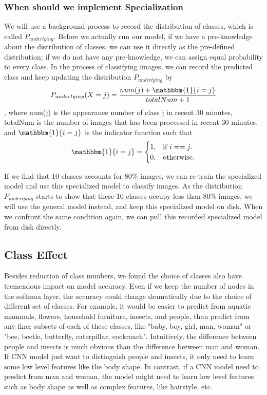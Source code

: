 \documentclass{article}
\begin{document}
\subsubsection{When should we implement Specialization}
We will use a background process to record the distribution of classes, which is called $P_{underlying}$. Before we actually run our model, if we have a pre-knowledge about the distribution of classes, we can use it directly as the pre-defined distribution; if we do not have any pre-knowledge, we can assign equal probability to every class. In the process of classifying images, we can record the predicted class and keep updating the distribution $P_{underlying}$ by
\begin{equation}
    P_{underlying}(X = j) = \frac{num(j)+  \mathbbm{1}\{i = j\} }{totalNum + 1}
\end{equation}
, where num(j) is the appearance number of class j in recent 30 minutes, totalNum is the number of images that has been processed in recent 30 minutes, and $\mathbbm{1}\{i = j\}$ is the indicator function such that
\begin{equation}
  \mathbbm{1}\{i = j\}=\begin{cases}
    1, & \text{if $i==j$}.\\
    0, & \text{otherwise}.
  \end{cases}
\end{equation}

If we find that 10 classes accounts for 80\% images, we can re-train the specialized model and use this specialized model to classify images. As the distribution $P_{underlying}$ starts to show that these 10 classes occupy less than 80\% images, we will use the general model instead, and keep this specialized model on disk. When we confront the same condition again, we can pull this recorded specialized model from disk directly. 


\subsection{Class Effect}
Besides reduction of class numbers, we found the choice of classes also have tremendous impact on model accuracy. Even if we keep the number of nodes in the softmax layer, the accuracy could change dramatically due to the choice of different set of classes. For example, it would be easier to predict from aquatic mammals, flowers, household furniture, insects, and people, than predict from any finer subsets of each of these classes, like "baby, boy, girl, man, woman" or "bee, beetle, butterfly, caterpillar, cockroach". Intuitively, the difference between people and insects is much obvious than the difference between man and woman. If CNN model just want to distinguish people and insects, it only need to learn some low level features like the body shape. In contrast, if a CNN model need to predict from man and woman, the model might need to learn low level features such as body shape as well as complex features, like hairstyle, etc.
\end{document}
